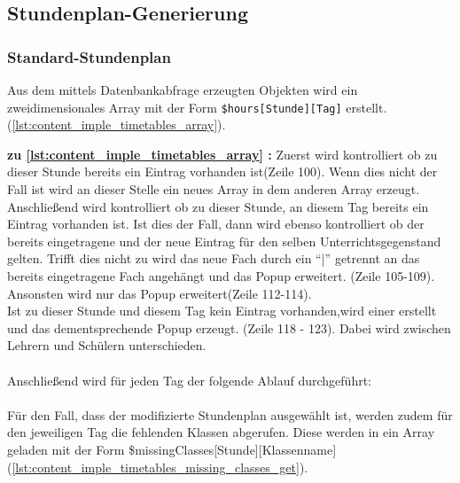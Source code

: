 \subsection{Stundenplan-Generierung}
\subsubsection{Standard-Stundenplan}
Aus dem mittels Datenbankabfrage erzeugten Objekten wird ein zweidimensionales Array mit der Form \texttt{\$hours[Stunde][Tag]} erstellt. (\autoref{lst:content_imple_timetables_array}).


\textbf{zu \autoref{lst:content_imple_timetables_array} :}
Zuerst wird kontrolliert ob zu dieser Stunde bereits ein Eintrag vorhanden ist(Zeile 100). Wenn dies nicht der Fall ist wird an dieser Stelle ein neues Array in dem anderen Array erzeugt.\\
Anschließend wird kontrolliert ob zu dieser Stunde, an diesem Tag bereits ein Eintrag vorhanden ist. Ist dies der Fall, dann wird ebenso kontrolliert ob der bereits eingetragene und der neue Eintrag für den selben Unterrichtsgegenstand gelten. Trifft dies nicht zu wird das neue Fach durch ein \enquote{|} getrennt an das bereits eingetragene Fach angehängt und das Popup erweitert. (Zeile 105-109). Ansonsten wird nur das Popup erweitert(Zeile 112-114).\\
Ist zu dieser Stunde und diesem Tag kein Eintrag vorhanden,wird einer erstellt und das dementsprechende Popup erzeugt. (Zeile 118 - 123). Dabei wird zwischen Lehrern und Schülern unterschieden.
\\\\
Anschließend wird für jeden Tag der folgende Ablauf durchgeführt:\\\\
Für den Fall, dass der modifizierte Stundenplan ausgewählt ist, werden zudem für den jeweiligen Tag die fehlenden Klassen abgerufen. Diese werden in ein Array geladen mit der Form \$missingClasses[Stunde][Klassenname] (\autoref{lst:content_imple_timetables_missing_classes_get}).\\



